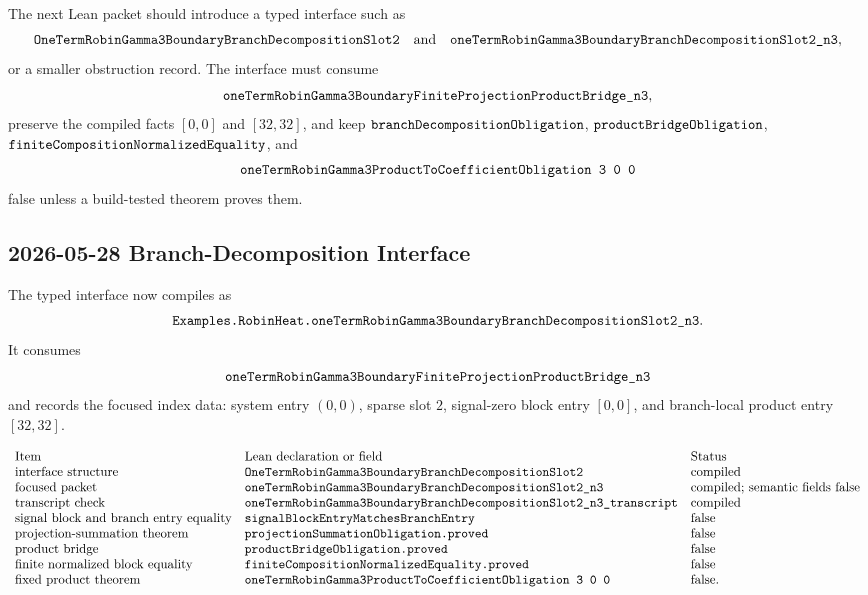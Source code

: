 The next Lean packet should introduce a typed interface such as
\[
  \texttt{OneTermRobinGamma3BoundaryBranchDecompositionSlot2}
  \quad\text{and}\quad
  \texttt{oneTermRobinGamma3BoundaryBranchDecompositionSlot2\_n3},
\]
or a smaller obstruction record.  The interface must consume
\[
  \texttt{oneTermRobinGamma3BoundaryFiniteProjectionProductBridge\_n3},
\]
preserve the compiled facts \([0,0]\) and \([32,32]\), and keep
\(\texttt{branchDecompositionObligation}\),
\(\texttt{productBridgeObligation}\),
\(\texttt{finiteCompositionNormalizedEquality}\), and
\[
  \Lean{oneTermRobinGamma3ProductToCoefficientObligation\ 3\ 0\ 0}
\]
false unless a build-tested theorem proves them.

\subsection{2026-05-28 Branch-Decomposition Interface}

The typed interface now compiles as
\[
  \texttt{Examples.RobinHeat.oneTermRobinGamma3BoundaryBranchDecompositionSlot2\_n3}.
\]
It consumes
\[
  \texttt{oneTermRobinGamma3BoundaryFiniteProjectionProductBridge\_n3}
\]
and records the focused index data: system entry \((0,0)\), sparse slot \(2\),
signal-zero block entry \([0,0]\), and branch-local product entry \([32,32]\).

\[
\begin{array}{lll}
\text{Item} & \text{Lean declaration or field} & \text{Status}\\
\text{interface structure} &
\texttt{OneTermRobinGamma3BoundaryBranchDecompositionSlot2} &
\text{compiled}\\
\text{focused packet} &
\texttt{oneTermRobinGamma3BoundaryBranchDecompositionSlot2\_n3} &
\text{compiled; semantic fields false}\\
\text{transcript check} &
\texttt{oneTermRobinGamma3BoundaryBranchDecompositionSlot2\_n3\_transcript} &
\text{compiled}\\
\text{signal block and branch entry equality} &
\texttt{signalBlockEntryMatchesBranchEntry} &
\text{false}\\
\text{projection-summation theorem} &
\texttt{projectionSummationObligation.proved} &
\text{false}\\
\text{product bridge} &
\texttt{productBridgeObligation.proved} &
\text{false}\\
\text{finite normalized block equality} &
\texttt{finiteCompositionNormalizedEquality.proved} &
\text{false}\\
\text{fixed product theorem} &
\texttt{oneTermRobinGamma3ProductToCoefficientObligation\ 3\ 0\ 0} &
\text{false}.
\end{array}
\]

